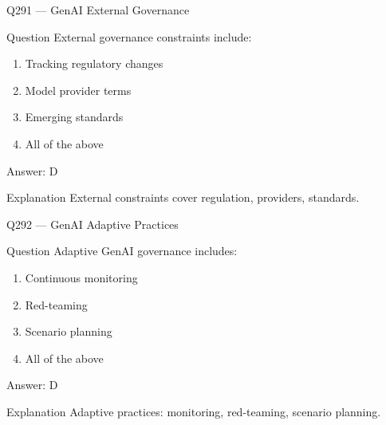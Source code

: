 \documentclass[aspectratio=169,8pt]{beamer}
\begin{document}
										\begin{frame}{Q291 --- GenAI External Governance}
											\begin{block}{Question}
												External governance constraints include:
												\begin{enumerate}
													\item Tracking regulatory changes
													\item Model provider terms
													\item Emerging standards
													\item All of the above
												\end{enumerate}
											\end{block}
											\begin{exampleblock}{Answer: D}\end{exampleblock}
											\begin{block}{Explanation}
												External constraints cover regulation, providers, standards.
											\end{block}
										\end{frame}
										
										\begin{frame}{Q292 --- GenAI Adaptive Practices}
											\begin{block}{Question}
												Adaptive GenAI governance includes:
												\begin{enumerate}
													\item Continuous monitoring
													\item Red-teaming
													\item Scenario planning
													\item All of the above
												\end{enumerate}
											\end{block}
											\begin{exampleblock}{Answer: D}\end{exampleblock}
											\begin{block}{Explanation}
												Adaptive practices: monitoring, red-teaming, scenario planning.
											\end{block}
										\end{frame}
										
\end{document}
